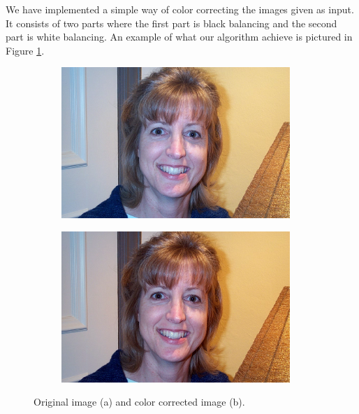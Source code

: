We have implemented a simple way of color correcting the images given as input. It consists of two parts where the first part is black balancing and the second part is white balancing. An example of what our algorithm achieve is pictured in Figure \ref{fig:cc}.  

\begin{figure}[H]
\centering

\begin{subfigure}{.33\textwidth}
  \centering
  \includegraphics[width=0.95\textwidth]{img/cc/orig.jpg}
  \caption{}
\end{subfigure}%
\begin{subfigure}{.33\textwidth}
  \centering
  \includegraphics[width=0.95\textwidth]{img/cc/cc.png}
  \caption{}
\end{subfigure}%

\caption{Original image (a) and color corrected image (b).}


\label{fig:cc}
\end{figure}


